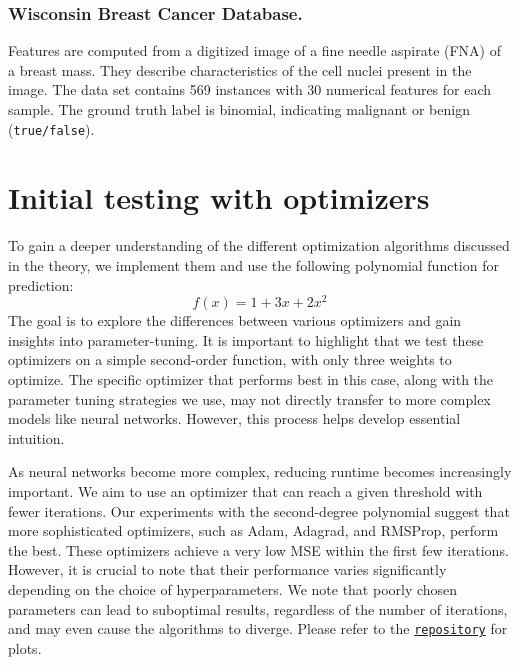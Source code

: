 \documentclass{article}
\begin{document}
\begin{multicols}{2}
\subsubsection*{Wisconsin Breast Cancer Database.}
Features are computed from a digitized image of a fine needle aspirate (FNA) of a breast mass.  They describe characteristics of the cell nuclei present in the image. \cite{william_wolberg_breast_1993} The data set contains 569 instances with 
30 numerical features for each sample. The ground truth label is binomial, indicating malignant or benign (\texttt{true/false}).
\end{multicols}



\section*{Initial testing with optimizers}
\begin{multicols}{2}
To gain a deeper understanding of the different optimization algorithms discussed in the theory, we implement them and use the following polynomial function for prediction:
\begin{equation*} \label{eq:function_for_testing_optimization}
    f(x) = 1 + 3x + 2x^2
\end{equation*}
The goal is to explore the differences between various optimizers and gain insights into parameter-tuning. It is important to highlight that we test these optimizers on a simple second-order function, with only three weights to optimize. The specific optimizer that performs best in this case, along with the parameter tuning strategies we use, may not directly transfer to more complex models like neural networks. However, this process helps develop essential intuition.

As neural networks become more complex, reducing runtime becomes increasingly important. We aim to use an optimizer that can reach a given threshold with fewer iterations. Our experiments with the second-degree polynomial suggest that more sophisticated optimizers, such as Adam, Adagrad, and RMSProp, perform the best. These optimizers achieve a very low MSE within the first few iterations. However, it is crucial to note that their performance varies significantly depending on the choice of hyperparameters. We note that poorly chosen parameters can lead to suboptimal results, regardless of the number of iterations, and may even cause the algorithms to diverge. Please refer to the  \href{https://github.com/EOH-ML/FYS-STK3155-Projects/tree/main/project2/figures/figures_GD}{\texttt{repository}} for plots.
\end{multicols}
\end{document}
